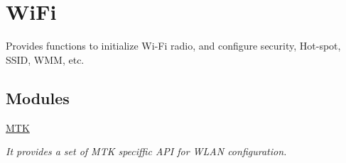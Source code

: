 \hypertarget{group__FAPI__WLAN}{\section{Wi\-Fi}
\label{group__FAPI__WLAN}
}


Provides functions to initialize Wi-\/\-Fi radio, and configure security, Hot-\/spot, S\-S\-I\-D, W\-M\-M, etc.  


\subsection*{Modules}
\begin{DoxyCompactItemize}
\item 
\hyperlink{group__FAPI__WLAN__MTK}{M\-T\-K}
\begin{DoxyCompactList}\small\item\em It provides a set of M\-T\-K speciffic A\-P\-I for W\-L\-A\-N configuration. \end{DoxyCompactList}\end{DoxyCompactItemize}
